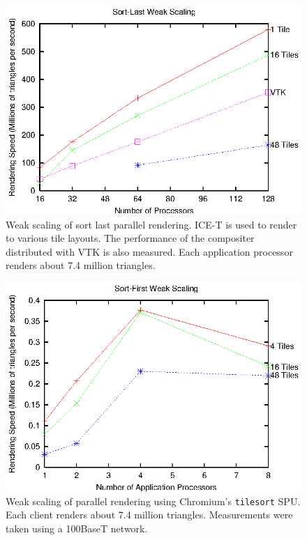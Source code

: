 \documentclass{acmsiggraph}
\newcommand{\cidentifier}[1]{\texttt{#1}}
\begin{document}
  \begin{figure}
    \includegraphics[width=\linewidth]{images/scaling_icet_weak}
    \caption{Weak scaling of sort last parallel rendering.  ICE-T is used
      to render to various tile layouts.  The performance of the compositer
      distributed with VTK is also measured.  Each application processor
      renders about 7.4 million triangles.}
    \label{fig:ice-t}
  \end{figure}

  \begin{figure}
    \includegraphics[width=\linewidth]{images/scaling_chromium}
    \caption{Weak scaling of parallel rendering using Chromium's
      \cidentifier{tile\-sort} SPU.  Each client renders about 7.4 million
      triangles.  Measurements were taken using a 100BaseT network.}
    \label{fig:chromium}
  \end{figure}
\end{document}
